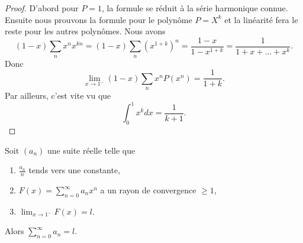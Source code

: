 \begin{proof}
    D'abord pour \( P=1\), la formule se réduit à la série harmonique connue. Ensuite nous prouvons la formule pour le polynôme \( P=X^k\) et la linéarité fera le reste pour les autres polynômes. Nous avons
    \begin{equation}
        (1-x)\sum_nx^nx^{kn}=(1-x)\sum_n(x^{1+k})^n=\frac{ 1-x }{ 1-x^{1+k} }=\frac{1}{ 1+x+\ldots+x^k }.
    \end{equation}
    Donc
    \begin{equation}
        \lim_{x\to 1^-} (1-x)\sum_nx^nP(x^n)=\frac{1}{ 1+k }.
    \end{equation}
    Par ailleurs, c'est vite vu que
    \begin{equation}
        \int_0^1 x^kdx=\frac{1}{ k+1 }.
    \end{equation}
\end{proof}

\begin{theorem}      \label{ThoPdDxgP}
    Soit \( (a_n)\) une suite réelle telle que
    \begin{enumerate}
        \item
            \( \frac{ a_n }{ n }\) tends vers une constante,
        \item
            \( F(x)=\sum_{n=0}^{\infty}a_nx^n\) a un rayon de convergence \( \geq 1\),
        \item
            \( \lim_{x\to 1^-} F(x)=l\).
    \end{enumerate}
    Alors \( \sum_{n=0}^{\infty}a_n=l\).
\end{theorem}

